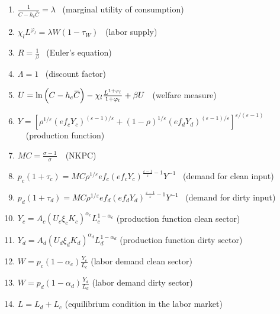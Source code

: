 \documentclass{article}
\begin{document}
\begin{enumerate}
\item $\frac{1}{C-h_{c}\overset{\_}{C}}=\lambda $ \ (marginal utility of
consumption)

\item $\chi _{l}L^{\varphi _{l}}=\lambda W(1-\tau _{W})$ \ (labor supply)

\item $R=\frac{1}{\beta }$ \ (Euler's equation)

\item $\Lambda =1$ \ (discount factor)

\item $U=\ln \left( C-h_{c}\overset{\_}{C}\right) -\chi _{l}\frac{%
L^{1+\varphi _{l}}}{1+\varphi _{l}}+\beta U$ \ (welfare measure)

\item $Y=\left[ \rho ^{1/\varepsilon }\left( ef_{c}Y_{c}\right) ^{\left(
\varepsilon -1\right) /\varepsilon }+(1-\rho )^{1/\varepsilon }\left(
ef_{d}Y_{d}\right) ^{\left( \varepsilon -1\right) /\varepsilon }\right]
^{\varepsilon /(\varepsilon -1)}$\ \ (production function)

\item $MC=\frac{\sigma -1}{\sigma }$\ \ (NKPC)

\item $p_{c}\left( 1+\tau _{c}\right) =MC\rho ^{1/\varepsilon }ef_{c}\left(
ef_{c}Y_{c}\right) ^{\frac{\varepsilon -1}{\varepsilon }-1}Y^{-1}$ \ (demand
for clean input)

\item $p_{d}\left( 1+\tau _{d}\right) =MC\rho ^{1/\varepsilon }ef_{d}\left(
ef_{d}Y_{d}\right) ^{\frac{\varepsilon -1}{\varepsilon }-1}Y^{-1}$ \ (demand
for dirty input)

\item $Y_{c}=A_{c}\left( U_{c}\xi _{c}K_{c}\right) ^{\alpha
_{c}}L_{c}^{1-\alpha _{c}}$ (production function clean sector)

\item $Y_{d}=A_{d}\left( U_{d}\xi _{d}K_{d}\right) ^{\alpha
_{d}}L_{d}^{1-\alpha _{d}}$ (production function dirty sector)

\item $W=p_{c}\left( 1-\alpha _{c}\right) \frac{Y_{c}}{L_{c}}$ (labor demand
clean sector)

\item $W=p_{d}\left( 1-\alpha _{d}\right) \frac{Y_{d}}{L_{d}}$ (labor demand
dirty sector)

\item $L=L_{d}+L_{c}$ (equilibrium condition in the labor market)


\end{enumerate}
\end{document}
